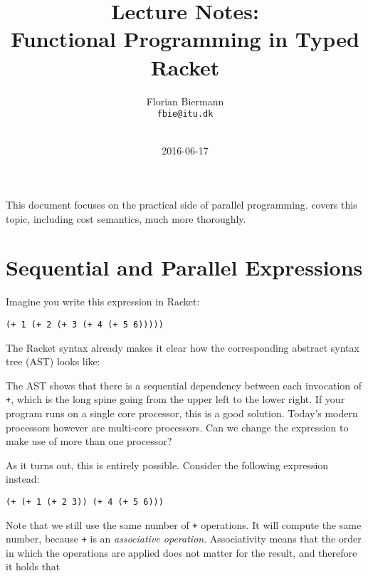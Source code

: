 \documentclass{article}
\title{Lecture Notes:\\Functional Programming in Typed Racket}
\author{Florian Biermann \\\small{\texttt{fbie@itu.dk}} \\~}
\date{2016-06-17}
\begin{document}
\maketitle

This document focuses on the practical side of parallel programming. \citet{Erdmann2016Parallelism} covers this topic, including cost semantics, much more thoroughly.

\section{Sequential and Parallel Expressions}

Imagine you write this expression in Racket:

\begin{center}
  \lstinline{(+ 1 (+ 2 (+ 3 (+ 4 (+ 5 6)))))}
\end{center}


The Racket syntax already makes it clear how the corresponding abstract syntax tree (AST) looks like:

\begin{center}
\end{center}

The AST shows that there is a sequential dependency between each invocation of \lstinline{+}, which is the long spine going from the upper left to the lower right. If your program runs on a single core processor, this is a good solution. Today's modern processors however are multi-core processors. Can we change the expression to make use of more than one processor?

As it turns out, this is entirely possible. Consider the following expression instead:

\begin{center}
  \lstinline{(+ (+ 1 (+ 2 3)) (+ 4 (+ 5 6)))}
\end{center}

Note that we still use the same number of \lstinline{+} operations. It will compute the same number, because \lstinline{+} is an \emph{associative operation}. Associativity means that the order in which the operations are applied does not matter for the result, and therefore it holds that
\end{document}
